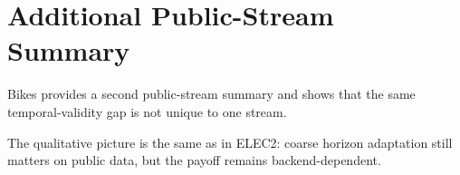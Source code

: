 \section{Additional Public-Stream Summary}\label{app:real_stream_arena}

Bikes provides a second public-stream summary and shows that the same
temporal-validity gap is not unique to one stream.



The qualitative picture is the same as in ELEC2: coarse horizon adaptation still
matters on public data, but the payoff remains backend-dependent.
